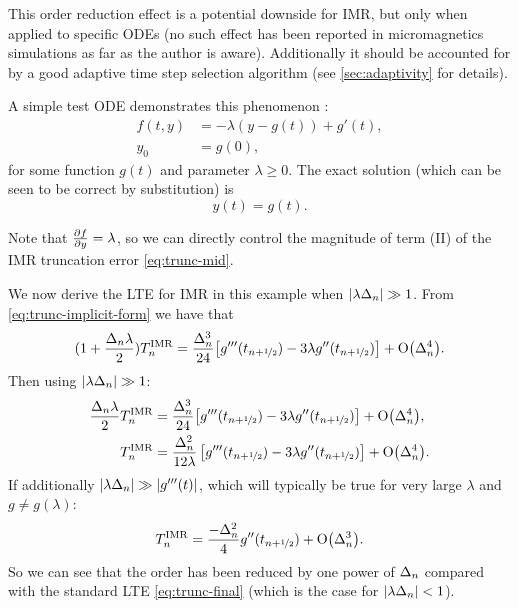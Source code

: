This order reduction effect is a potential downside for IMR, but only when applied to specific ODEs (no such effect has been reported in micromagnetics simulations as far as the author is aware).
Additionally it should be accounted for by a good adaptive time step selection algorithm (see \cref{sec:adaptivity} for details).

A simple test ODE demonstrates this phenomenon \cite[157]{Atkinson2009}:
\begin{equation}
  \begin{aligned}
    \label{eqn:imr-test-order-reduction}
    f(t, y) &= -\lambda (y - g(t)) + g'(t), \\
    y_0 &= g(0),
  \end{aligned}
\end{equation}
for some function $g(t)$ and parameter $\lambda \geq 0$.
The exact solution (which can be seen to be correct by substitution) is
\begin{equation}
  y(t) = g(t).
\end{equation}

Note that $\frac{\partial f}{\partial y} = \lambda$, so we can directly control the magnitude of term (II) of the IMR truncation error \eqref{eq:trunc-mid}.

We now derive the LTE for IMR in this example when $\left|{\lambda\Delta_{n}} \right| \gg 1$.
From \cref{eq:trunc-implicit-form} we have that
\begin{equation}
  \begin{aligned}
    (1 + \frac{\Delta_{n} \lambda}{2})T_n^{\mathrm{IMR}} &= \frac{\Delta_{n}^3}{24}
    {\left[ g'''(t_{n+\nicefrac{1}{2}}) - 3 \lambda g''(t_{n+\nicefrac{1}{2}}) \right]} + \mathrm{O}{\left( \Delta_{n}^4 \right)}. \\
  \end{aligned}
\end{equation}
Then using $\left|{\lambda\Delta_{n}} \right| \gg 1$:
\begin{equation}
  \begin{aligned}
    \frac{\Delta_{n} \lambda}{2} T_n^{\mathrm{IMR}} &= \frac{\Delta_{n}^3}{24}
    {\left[ g'''(t_{n+\nicefrac{1}{2}}) - 3 \lambda g''(t_{n+\nicefrac{1}{2}}) \right]} + \mathrm{O}{\left( \Delta_{n}^4 \right)}, \\
    T_n^{\mathrm{IMR}} &= \frac{\Delta_{n}^2}{12\lambda} \left[g'''(t_{n+\nicefrac{1}{2}}) - 3 \lambda g''(t_{n+\nicefrac{1}{2}}) \right] + \mathrm{O}{\left( \Delta_{n}^4 \right)}. \\
  \end{aligned}
\end{equation}
If additionally $\left|{\lambda\Delta_{n}} \right| \gg \left|{g'''(t)} \right|$, which will typically be true for very large $\lambda$ and $g \neq g(\lambda)$:
\begin{equation}
  T_n^{\mathrm{IMR}} = \frac{-\Delta_{n}^2}{4} g''(t_{n+\nicefrac{1}{2}}) + \mathrm{O}{\left( \Delta_{n}^3 \right)}.
  \label{eq:reduced-order-imr-truncation-error}
\end{equation}
So we can see that the order has been reduced by one power of $\Delta_{n}$ compared with the standard LTE \cref{eq:trunc-final} (which is the case for $\left|{\lambda\Delta_{n}} \right| < 1$).


